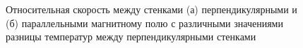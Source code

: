 \begin{figure}[h]
	\caption{Относительная скорость между стенками (а) перпендикулярными и (б) параллельными магнитному полю с различными значениями разницы температур между перпендикулярными стенками}
	\label{fig:heat_velocity}
\end{figure}

